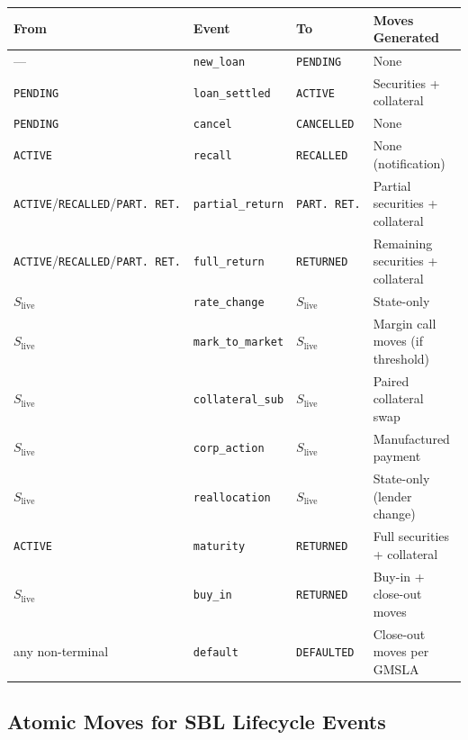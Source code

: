 \documentclass[11pt,a4paper]{article}
\begin{document}
\begin{center}
\small
\begin{tabular}{l l l l}
\toprule
\textbf{From} & \textbf{Event} & \textbf{To} & \textbf{Moves Generated} \\
\midrule
--- & \texttt{new\_loan} & \texttt{PENDING} & None \\
\texttt{PENDING} & \texttt{loan\_settled} & \texttt{ACTIVE} & Securities + collateral \\
\texttt{PENDING} & \texttt{cancel} & \texttt{CANCELLED} & None \\
\texttt{ACTIVE} & \texttt{recall} & \texttt{RECALLED} & None (notification) \\
\texttt{ACTIVE}/\texttt{RECALLED}/\texttt{PART.\ RET.} & \texttt{partial\_return} & \texttt{PART.\ RET.} & Partial securities + collateral \\
\texttt{ACTIVE}/\texttt{RECALLED}/\texttt{PART.\ RET.} & \texttt{full\_return} & \texttt{RETURNED} & Remaining securities + collateral \\
$S_{\mathrm{live}}$ & \texttt{rate\_change} & $S_{\mathrm{live}}$ & State-only \\
$S_{\mathrm{live}}$ & \texttt{mark\_to\_market} & $S_{\mathrm{live}}$ & Margin call moves (if threshold) \\
$S_{\mathrm{live}}$ & \texttt{collateral\_sub} & $S_{\mathrm{live}}$ & Paired collateral swap \\
$S_{\mathrm{live}}$ & \texttt{corp\_action} & $S_{\mathrm{live}}$ & Manufactured payment \\
$S_{\mathrm{live}}$ & \texttt{reallocation} & $S_{\mathrm{live}}$ & State-only (lender change) \\
\texttt{ACTIVE} & \texttt{maturity} & \texttt{RETURNED} & Full securities + collateral \\
$S_{\mathrm{live}}$ & \texttt{buy\_in} & \texttt{RETURNED} & Buy-in + close-out moves \\
any non-terminal & \texttt{default} & \texttt{DEFAULTED} & Close-out moves per GMSLA \\
\bottomrule
\end{tabular}
\end{center}

\subsection{Atomic Moves for SBL Lifecycle Events}
\label{sec:sbl-moves}
\end{document}
